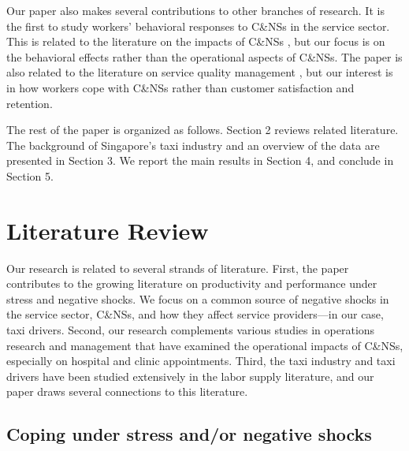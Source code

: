 \documentclass[reviewmode]{restud}
\begin{document}
Our paper also makes several contributions to other branches of research. It is the first to study workers' behavioral responses to C\&NSs in the service sector. This is related to the literature on the impacts of C\&NSs \citep{moore2001time,patrick2008reducing,norris2014empirical,feldman2014appointment}, but our focus is on the behavioral effects rather than the operational aspects of C\&NSs. The paper is also related to the literature on service quality management \citep{cohen2018frustration}, but our interest is in how workers cope with C\&NSs rather than customer satisfaction and retention. 


The rest of the paper is organized as follows. Section 2 reviews related literature. The background of Singapore's taxi industry and an overview of the data are presented in Section 3.  We report the main results in Section 4, 
and conclude %
 in Section 5.

\section{Literature Review}

Our research is related to several strands of literature. First, the paper contributes to the growing literature on productivity and performance under stress and negative shocks. We focus on a common source of negative shocks in the service sector, C\&NSs, and how they affect service providers---in our case, taxi drivers. Second, our research complements various studies in operations research and management that have examined the operational impacts of C\&NSs, especially on hospital and clinic appointments. Third, the taxi industry and taxi drivers  have been studied extensively in the labor supply literature, and our paper draws several connections to this literature.  


\subsection{Coping under stress and/or negative shocks}
\end{document}
